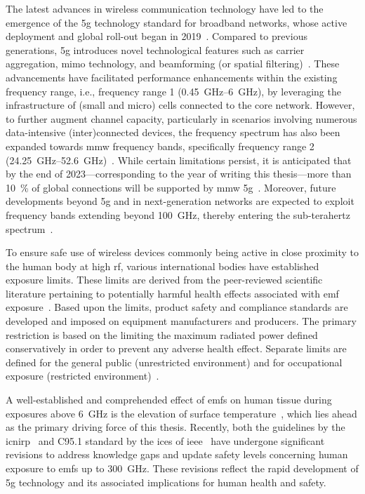 The latest advances in wireless communication technology have led to the emergence of the \gls{5g} technology standard for broadband networks, whose active deployment and global roll-out began in 2019~\cite{GSA2019rollout}.
Compared to previous generations, \gls{5g} introduces novel technological features such as carrier aggregation, \gls{mimo} technology, and beamforming (or spatial filtering)~\cite{Andrews2014What}.
These advancements have facilitated performance enhancements within the existing frequency range, i.e., frequency range 1 (\SIrange{0.45}{6}{\GHz}), by leveraging the infrastructure of (small and micro) cells connected to the core network.
However, to further augment channel capacity, particularly in scenarios involving numerous data-intensive (inter)connected devices, the frequency spectrum has also been expanded towards \gls{mmw} frequency bands, specifically frequency range 2 (\SIrange{24.25}{52.6}{\GHz})~\cite{Rappaport2013Millimeter}.
While certain limitations persist, it is anticipated that by the end of 2023---corresponding to the year of writing this thesis---more than \SI{10}{\percent} of global connections will be supported by \gls{mmw} \gls{5g}~\cite{CISCO2023report}.
Moreover, future developments beyond \gls{5g} and in next-generation networks are expected to exploit frequency bands extending beyond \SI{100}{\GHz}, thereby entering the sub-terahertz spectrum~\cite{Ericsson20236g,Yao2023Study}.

To ensure safe use of wireless devices commonly being active in close proximity to the human body at high \gls{rf}, various international bodies have established exposure limits.
These limits are derived from the peer-reviewed scientific literature pertaining to potentially harmful health effects associated with \gls{emf} exposure~\cite{ICNIRP2020Principles}.
Based upon the limits, product safety and compliance standards are developed and imposed on equipment manufacturers and producers.
The primary restriction is based on the limiting the maximum radiated power defined conservatively in order to prevent any adverse health effect.
Separate limits are defined for the general public (unrestricted environment) and for occupational exposure (restricted environment)~\cite{Hirata2021Assessment}.

A well-established and comprehended effect of \gls{emf}s on human tissue during exposures above \SI{6}{\GHz} is the elevation of surface temperature~\cite{Ziskin2018Tissue}, which lies ahead as the primary driving force of this thesis.
Recently, both the guidelines by the \gls{icnirp}~\cite{ICNIRP2020Guidelines} and C95.1 standard by the \gls{ices} of \gls{ieee}~\cite{IEEE2019Standard} have
undergone significant revisions to address knowledge gaps and update safety levels concerning human exposure to \gls{emf}s up to \SI{300}{\GHz}.
These revisions reflect the rapid development of \gls{5g} technology and its associated implications for human health and safety.

